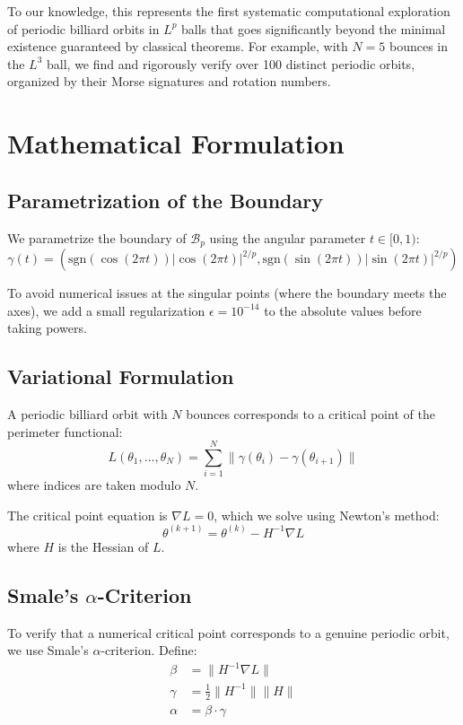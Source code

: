 \documentclass[11pt]{article}
\theoremstyle{plain}
\theoremstyle{definition}
\theoremstyle{remark}
\begin{document}
To our knowledge, this represents the first systematic computational exploration of periodic billiard orbits in $L^p$ balls that goes significantly beyond the minimal existence guaranteed by classical theorems. For example, with $N=5$ bounces in the $L^3$ ball, we find and rigorously verify over 100 distinct periodic orbits, organized by their Morse signatures and rotation numbers.

\section{Mathematical Formulation}

\subsection{Parametrization of the Boundary}

We parametrize the boundary of $\mathcal{B}_p$ using the angular parameter $t \in [0,1)$:
\[
\gamma(t) = \left(\text{sgn}(\cos(2\pi t))|\cos(2\pi t)|^{2/p}, 
\text{sgn}(\sin(2\pi t))|\sin(2\pi t)|^{2/p}\right)
\]

To avoid numerical issues at the singular points (where the boundary meets the axes), we add a small regularization $\epsilon = 10^{-14}$ to the absolute values before taking powers.

\subsection{Variational Formulation}

A periodic billiard orbit with $N$ bounces corresponds to a critical point of the perimeter functional:
\[
L(\theta_1, \ldots, \theta_N) = \sum_{i=1}^N \|\gamma(\theta_i) - \gamma(\theta_{i+1})\|
\]
where indices are taken modulo $N$.

The critical point equation is $\nabla L = 0$, which we solve using Newton's method:
\[
\theta^{(k+1)} = \theta^{(k)} - H^{-1}\nabla L
\]
where $H$ is the Hessian of $L$.

\subsection{Smale's $\alpha$-Criterion}

To verify that a numerical critical point corresponds to a genuine periodic orbit, we use Smale's $\alpha$-criterion. Define:
\begin{align}
\beta &= \|H^{-1}\nabla L\| \\
\gamma &= \frac{1}{2}\|H^{-1}\|\|H\| \\
\alpha &= \beta \cdot \gamma
\end{align}
\end{document}
